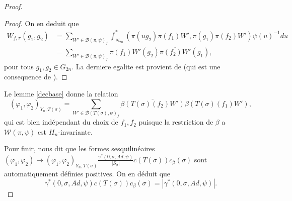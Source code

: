 \documentclass{amsart}
\begin{document}
\begin{proof}
\begin{proof}
On en deduit que
\begin{equation}
\begin{split}
W_{f, \pi}(g_1, g_2) &= \sum_{W' \in \mathcal{B}(\pi, \psi)_f} \int_{N_{2n}}^* (\pi(ug_2)\pi(f_1)W', \pi(g_1)\pi(f_2)W')\psi(u)^{-1}du \\
&= \sum_{W' \in \mathcal{B}(\pi, \psi)_f} \pi(f_1)W'(g_2)\overline{\pi(f_2)W'}(g_1),
\end{split}
\end{equation}
pour tous $g_1, g_2 \in G_{2n}$. La derniere egalite est provient de \cite[Prop 2.14.2]{beuzart-plessis} (qui est une consequence de \cite[Lemme 4.4]{lapid-mao}).
\end{proof}

Le lemme \ref{decbase} donne la relation
\begin{equation}
(\varphi_1, \varphi_2)_{Y_n, T(\sigma)} = \sum_{W' \in \mathcal{B}(T(\sigma), \psi)_f} \overline{\beta(T(\sigma)(f_2)W')} \beta(T(\sigma)(f_1)W'),
\end{equation}
qui est bien indépendant du choix de $f_1,f_2$ puisque la restriction de $\beta$ a $\mathcal{W}(\pi, \psi)$ est $H_n$-invariante.

Pour finir, \cite[prop 4.1.1]{beuzart-plessis} nous dit que les formes sesquilinéaires $(\varphi_1, \varphi_2) \mapsto (\varphi_1, \varphi_2)_{Y_n, T(\sigma)} \frac{\gamma^*(0, \sigma, Ad, \psi)}{|S_\sigma|} c(T(\sigma))c_\beta(\sigma)$ sont automatiquement définies positives. On en déduit que 
\begin{equation}
\gamma^*(0, \sigma, Ad, \psi) c(T(\sigma))c_\beta(\sigma) = |\gamma^*(0, \sigma, Ad, \psi)|.
\end{equation}
\end{proof}

 
 
\end{document}

